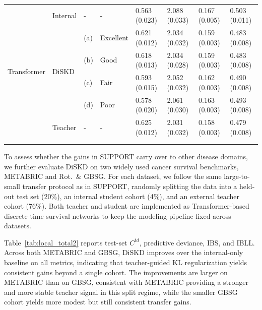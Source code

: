 \documentclass{article}
\theoremstyle{plain}
\theoremstyle{definition}
\theoremstyle{remark}
\begin{document}
\begin{table}[htbp]
\begin{small}
\begin{tabular}{llllllll}
\hline\hline
\multirow{6}{*}{Transformer} & Internal & - & - & \cellcolor{blkE!12}0.563 (0.023) & \cellcolor{blkE!12}2.088 (0.033) & \cellcolor{blkE!12}0.167 (0.005) & \cellcolor{blkE!12}0.503 (0.011) \\ 
\cmidrule{2-8} & \multirow{4}{*}{DiSKD} & (a) & Excellent & \cellcolor{blkE!36}0.621 (0.012) & \cellcolor{blkE!36}2.034 (0.032) & \cellcolor{blkE!36}0.159 (0.003) & \cellcolor{blkE!36}0.483 (0.008) \\
                                   & & (b) & Good & \cellcolor{blkE!28}0.618 (0.013) & \cellcolor{blkE!36}2.034 (0.028) & \cellcolor{blkE!36}0.159 (0.003) & \cellcolor{blkE!36}0.483 (0.008) \\
                                   & & (c) & Fair & \cellcolor{blkE!28}0.593 (0.015) & \cellcolor{blkE!28}2.052 (0.032) & \cellcolor{blkE!28}0.162 (0.003) & \cellcolor{blkE!28}0.490 (0.008) \\
                                   & & (d) & Poor & \cellcolor{blkE!20}0.578 (0.020) & \cellcolor{blkE!20}2.061 (0.030) & \cellcolor{blkE!20}0.163 (0.003) & \cellcolor{blkE!20}0.493 (0.008) \\ 
\cmidrule{2-8} 
& Teacher & - & - & \cellcolor{blkE!44}0.625 (0.012) & \cellcolor{blkE!44}2.031 (0.032) & \cellcolor{blkE!44}0.158 (0.003) & \cellcolor{blkE!44}0.479 (0.008) \\ 
\bottomrule & & & & & \\
 & & & & &                      
\end{tabular}
\end{small}
\end{table}



To assess whether the gains in SUPPORT carry over to other disease domains, we further evaluate DiSKD on two widely used cancer survival benchmarks, METABRIC and Rot.\ \& GBSG.
For each dataset, we follow the same large-to-small transfer protocol as in SUPPORT, randomly splitting the data into a held-out test set (20\%), an internal student cohort (4\%), and an external teacher cohort (76\%).
Both teacher and student are implemented as Transformer-based discrete-time survival networks to keep the modeling pipeline fixed across datasets.

Table~\ref{tab:local_total2} reports test-set $C^{td}$, predictive deviance, IBS, and IBLL.
Across both METABRIC and GBSG, DiSKD improves over the internal-only baseline on all metrics, indicating that teacher-guided KL regularization yields consistent gains beyond a single cohort.
The improvements are larger on METABRIC than on GBSG, consistent with METABRIC providing a stronger and more stable teacher signal in this split regime, while the smaller GBSG cohort yields more modest but still consistent transfer gains.
\end{document}
